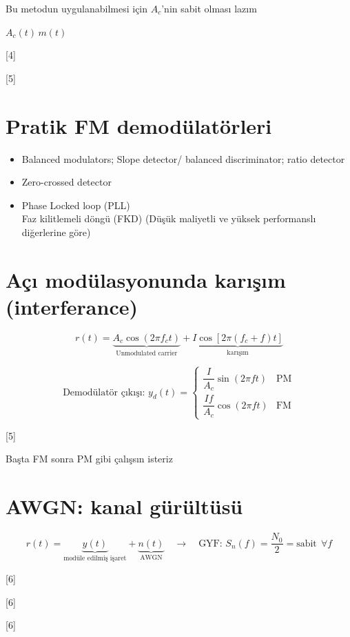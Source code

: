 \documentclass[11pt,a4paper]{article}
\begin{document}
Bu metodun uygulanabilmesi için $A_c$'nin sabit olması lazım

$A_c(t)\,m(t)$

[4]

[5]

\section{Pratik FM demodülatörleri}
\begin{itemize}
\item Balanced modulators; Slope detector/ balanced discriminator; ratio detector
\item Zero-crossed detector
\item Phase Locked loop (PLL) \\ Faz kilitlemeli döngü (FKD) \quad (Düşük maliyetli ve yüksek performanslı diğerlerine göre)
\end{itemize}

\section{Açı modülasyonunda karışım (interferance)}
\[ r(t) = \underbrace{A_c\cos(2\pi f_c t)}_{\text{Unmodulated carrier}} + \underbrace{I\cos\left[2\pi(f_c+f)t\right]}_{\text{karışım}} \]

\[ \text{Demodülatör çıkışı: } y_d(t)=\begin{cases} \dfrac{I}{A_c}\sin(2\pi f t) & \text{PM} \\[4pt] \dfrac{If}{A_c}\cos(2\pi f t) & \text{FM}\end{cases} \]

[5]

Başta FM sonra PM gibi çalışsın isteriz

\section{AWGN: kanal gürültüsü}
\[ r(t) = \underbrace{y(t)}_{\text{modüle edilmiş işaret}} + \underbrace{n(t)}_{\text{AWGN}} \quad\rightarrow\quad \text{GYF: } S_n(f)=\frac{N_0}{2}=\text{sabit}\ \ \forall f \]

[6]

[6]

[6]
\end{document}
